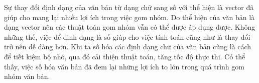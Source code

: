Sự thay đổi định dạng của văn bản từ dạng chữ sang số với thể hiện là vector đã giúp cho mang lại nhiều lợi ích trong việc gom nhóm.
Do thể hiện của văn bản là dạng vector nên các thuật toán gom nhóm vẫn có thể được áp dụng được.
Không những thế, việc để định dạng là số giúp cho việc tính toán cũng như là thay đổi trở nên dễ dàng hơn.
Khi ta số hóa các định dạng chữ của văn bản cũng là cách để tiết kiệm bộ nhớ, qua đó cải thiện thuật toán, tăng tốc độ thực thi.
Có thể thấy, việc số hóa văn bản đã đem lại những lợi ích to lớn trong quá trình gom nhóm văn bản.





